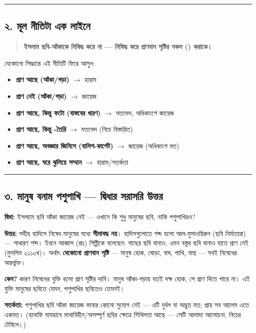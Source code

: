 \medskip\hrule\medskip

\subsection*{২. মূল নীতিটা এক লাইনে}

\begin{quote}
\textbf{ইসলাম ছবি-আঁকাকে নিষিদ্ধ করে না — নিষিদ্ধ করে প্রাণবান সৃষ্টির নকল () করাকে।}
\end{quote}

যেকোনো সিদ্ধান্তে এই নীতিটি ফিরে আসুন:
\begin{itemize}
\item \textbf{প্রাণ আছে (আঁকা/গড়া)} $\rightarrow$ হারাম
\item \textbf{প্রাণ নেই (আঁকা/গড়া)} $\rightarrow$ জায়েজ
\item \textbf{প্রাণ আছে, কিন্তু ফটো (বাস্তবের ধারণ)} $\rightarrow$ মতভেদ, অধিকাংশে জায়েজ
\item \textbf{প্রাণ আছে, কিন্তু -তৈরি} $\rightarrow$ মতভেদ (নিচে বিস্তারিত)
\item \textbf{প্রাণ আছে, অবজ্ঞার জিনিসে (বালিশ-কার্পেট)} $\rightarrow$ জায়েজ (অধিকাংশ মত)
\item \textbf{প্রাণ আছে, ঘরে ঝুলিয়ে সম্মান} $\rightarrow$ হারাম/সতর্কতা
\end{itemize}
\medskip\hrule\medskip

\subsection*{৩. মানুষ বনাম পশুপাখি — দ্বিধার সরাসরি উত্তর}

\textbf{দ্বিধা:} ইসলামে ছবি আঁকা জায়েজ নেই — এখানে কি শুধু মানুষের ছবি, নাকি পশুপাখিরও?

\textbf{উত্তর:} সহীহ হাদিসে নিষেধ মানুষের মধ্যে \textbf{সীমাবদ্ধ নয়}। হাদিসগুলোতে শব্দ হলো আল-মুসাওয়িরুন (ছবি নির্মাতারা) — সাধারণ শব্দ। ইবনে আব্বাস (রাঃ) শিল্পীকে বলেছেন: গাছের ছবি বানাও, এমন বস্তুর ছবি বানাও যাতে প্রাণ নেই (মুসলিম ২১১০খ)। অর্থাৎ \textbf{যেকোনো প্রাণবান সৃষ্টি} — মানুষ হোক, ঘোড়া, বাঘ, পাখি, মাছ — সবই নিষেধের অন্তর্ভুক্ত।

\textbf{কেন?} কারণ নিষেধের যুক্তি হলো প্রাণ সৃষ্টির দাবি। মানুষ আঁকা-গড়ায় যতই দক্ষ হোক, সে প্রাণ দিতে পারে না। এই যুক্তি মানুষের ছবিতে যেমন, পশুপাখির ছবিতেও তেমনই।

\textbf{সতর্কতা:} পশুপাখির ছবি আঁকা জায়েজ ভাবার কোনো সুযোগ নেই — এটি দুর্বল বা অদ্ভুত মত; প্রায় সব আলেম এতে একমত। (হানাফি মাযহাবে মাথাবিহীন/অসম্পূর্ণ ছবির ক্ষেত্রে শিথিলতা আছে — সেটি আলাদা আলোচনা, নিচের টেবিলে।)

